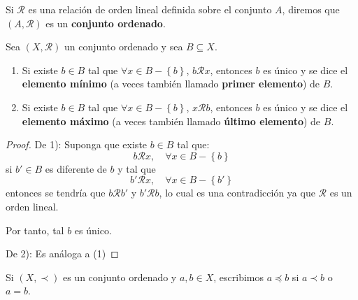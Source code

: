 \documentclass[12pt]{report}
\theoremstyle{largebreak}
\begin{document}
    \begin{mydef}
        Si $\mathcal{R}$ es una relación de orden lineal definida sobre el conjunto $A$, diremos que $(A,\mathcal{R})$ es un \textbf{conjunto ordenado}.
    \end{mydef}

    \begin{propo}
        Sea $(X,\mathcal{R})$ un conjunto ordenado y sea $B\subseteq X$.
        \begin{enumerate}
            \item Si existe $b\in B$ tal que $\forall x\in B-\left\{b\right\}$, $b\mathcal{R} x$, entonces $b$ es único y se dice el \textbf{elemento mínimo} (a veces también llamado \textbf{primer elemento}) de $B$.
            \item Si existe $b\in B$ tal que $\forall x\in B-\left\{b\right\}$, $x\mathcal{R} b$, entonces $b$ es único y se dice el \textbf{elemento máximo} (a veces también llamado \textbf{último elemento}) de $B$.
        \end{enumerate}
    \end{propo}

    \begin{proof}
        De 1): Suponga que existe $b\in B$ tal que:
        \begin{equation*}
            b\mathcal{R}x,\quad\forall x\in B-\left\{b\right\}
        \end{equation*}
        si $b'\in B$ es diferente de $b$ y tal que
        \begin{equation*}
            b'\mathcal{R}x,\quad\forall x\in B-\left\{b'\right\}
        \end{equation*}
        entonces se tendría que $b\mathcal{R}b'$ y $b'\mathcal{R}b$, lo cual es una contradicción ya que $\mathcal{R}$ es un orden lineal.

        Por tanto, tal $b$ es único.

        De 2): Es análoga a (1)

    \end{proof}

    \begin{obs}
        Si $(X,\prec)$ es un conjunto ordenado y $a,b\in X$, escribimos $a\preceq b$ si $a\prec b$ o $a=b$.
    \end{obs}
\end{document}
